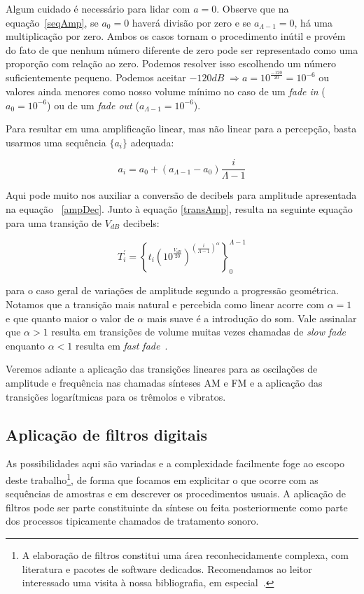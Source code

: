 Algum cuidado é necessário para lidar com $a=0$. Observe que
na equação~\ref{seqAmp}, se $a_0=0$ haverá divisão por zero e
se $a_{\Lambda-1}=0$, há uma multiplicação por zero. Ambos os casos
tornam o procedimento inútil e provém do fato de que nenhum número diferente de zero pode ser representado como uma proporção com relação ao zero. Podemos resolver isso escolhendo um número suficientemente pequeno. Podemos aceitar $-120dB\;\Rightarrow a=10^{\frac{-120}{20}}=10^{-6}$ ou valores ainda menores como nosso volume mínimo no caso de um
\emph{fade in} ($a_0=10^{-6}$) ou de um \emph{fade out} ($a_{\Lambda-1}=10^{-6}$).


Para resultar em uma amplificação linear, mas não linear para a percepção, basta usarmos uma sequência $\{a_i\}$ adequada:

\begin{equation}
a_i=a_0 + (a_{\Lambda-1}-a_0)\frac{i}{\Lambda-1}
\end{equation}

Aqui pode muito nos auxiliar a conversão de decibels para amplitude apresentada na equação ~\ref{ampDec}.
Junto à equação \ref{transAmp}, resulta na seguinte equação para uma transição de $V_{dB}$ decibels:

\begin{equation}
T_i^{'}=\left \{ t_i (10^{\frac{V_{dB}}{20}} )^{\left ( \frac{i}{\Lambda-1} \right )^\alpha} \right \}_0^{\Lambda-1}
\end{equation}

para o caso geral de variações de amplitude segundo a progressão geométrica. Notamos que a transição mais natural e percebida como linear acorre com $\alpha=1$ e que quanto maior o valor de $\alpha$ mais suave é a introdução do som. Vale assinalar que $\alpha>1$ resulta em transições de volume muitas vezes chamadas de \emph{slow fade} enquanto $\alpha<1$ resulta em \emph{fast fade}~\cite{fades}.

Veremos adiante a aplicação das transições lineares para as oscilações 
de amplitude e frequência nas chamadas sínteses AM e FM e a aplicação das transições
logarítmicas para os trêmolos e vibratos.

\subsection{Aplicação de filtros digitais}
 As possibilidades
aqui são variadas e a complexidade facilmente
foge ao escopo deste trabalho\footnote{A elaboração de filtros
constitui uma área reconhecidamente complexa, com literatura
e pacotes de software dedicados. 
Recomendamos ao leitor
interessado uma visita à nossa bibliografia, em especial~\cite{Openheim,smith}.},
de forma que focamos em explicitar o que ocorre com as sequências
de amostras e em descrever os procedimentos usuais.
A aplicação de filtros pode
ser parte constituinte da síntese ou feita posteriormente
como parte dos processos tipicamente chamados de tratamento sonoro.

